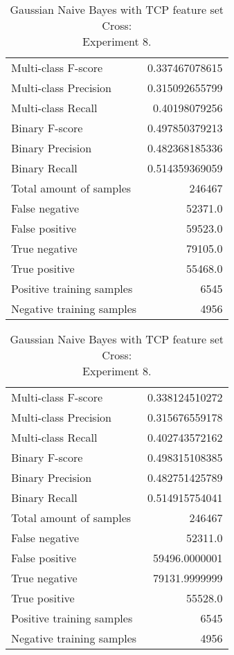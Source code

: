 \begin{table}[H]
\begin{minipage}{0.5\textwidth}
\caption{Gaussian Naive Bayes with TCP feature set Cross: \\Experiment 7.}
\centering
\begin{tabular}{l r}
\toprule
Multi-class F-score & 0.337467078615 \\
Multi-class Precision & 0.315092655799 \\
Multi-class Recall & 0.40198079256 \\
\midrule
Binary F-score & 0.497850379213 \\
Binary Precision & 0.482368185336 \\
Binary Recall & 0.514359369059 \\
\midrule
Total amount of samples & 246467 \\
False negative & 52371.0 \\
False positive & 59523.0 \\
True negative & 79105.0 \\
True positive & 55468.0 \\
\midrule
Positive training samples & 6545 \\
Negative training samples & 4956 \\
\bottomrule
\end{tabular}
\end{minipage}
\hfillx
\begin{minipage}{0.5\textwidth}
\caption{Gaussian Naive Bayes with TCP feature set Cross: \\Experiment 8.}
\centering
\begin{tabular}{l r}
\toprule
Multi-class F-score & 0.338124510272 \\
Multi-class Precision & 0.315676559178 \\
Multi-class Recall & 0.402743572162 \\
\midrule
Binary F-score & 0.498315108385 \\
Binary Precision & 0.482751425789 \\
Binary Recall & 0.514915754041 \\
\midrule
Total amount of samples & 246467 \\
False negative & 52311.0 \\
False positive & 59496.0000001 \\
True negative & 79131.9999999 \\
True positive & 55528.0 \\
\midrule
Positive training samples & 6545 \\
Negative training samples & 4956 \\
\bottomrule
\end{tabular}
\end{minipage}
\end{table}
